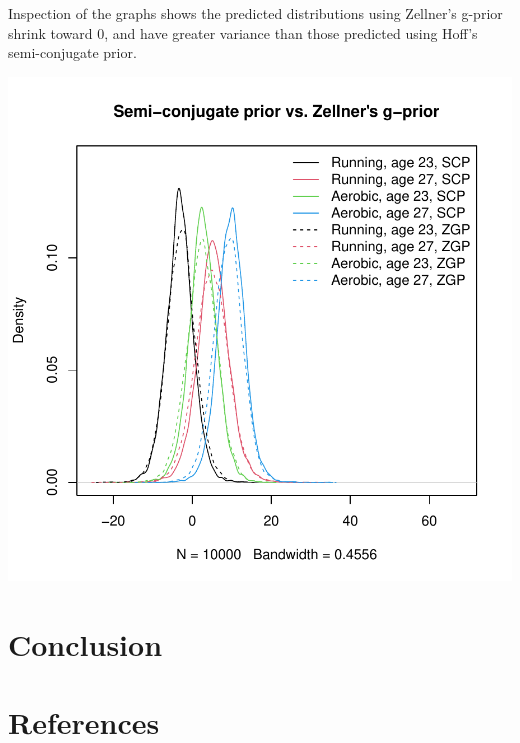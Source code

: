 \documentclass[12pt, a4paper]{article}
\begin{document}
Inspection of the graphs shows the predicted distributions using Zellner's g-prior shrink toward 0, and have greater variance than those predicted using Hoff's semi-conjugate prior.

\includegraphics{Thesis_v3-015}


\clearpage

\section{Conclusion}

\section{References}
\end{document}
